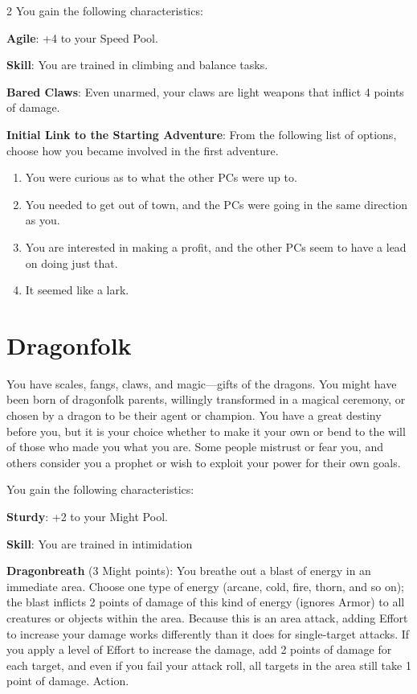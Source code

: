 \begin{multicols}{2}
You gain the following characteristics: 

\textbf{Agile}: +4 to your Speed Pool.

\textbf{Skill}: You are trained in climbing and balance tasks. 

\textbf{Bared Claws}: Even unarmed, your claws are light weapons that inflict 4 points of damage. 

\textbf{Initial Link to the Starting Adventure}: From the following list of options, choose how you became involved in the first adventure. 

\begin{enumerate}
\item You were curious as to what the other PCs were up to. 

\item You needed to get out of town, and the PCs were going in the same direction as you. 

\item You are interested in making a profit, and the other PCs seem to have a lead on doing just that. 

\item It seemed like a lark.
\end{enumerate}

\section{Dragonfolk}

You have scales, fangs, claws, and magic—gifts of the dragons. You might have been born of dragonfolk parents, willingly transformed in a magical ceremony, or chosen by a dragon to be their agent or champion. You have a great destiny before you, but it is your choice whether to make it your own or bend to the will of those who made you what you are. Some people mistrust or fear you, and others consider you a prophet or wish to exploit your power for their own goals. 

You gain the following characteristics: 

\textbf{Sturdy}: +2 to your Might Pool. 

\textbf{Skill}: You are trained in intimidation

\textbf{Dragonbreath} (3 Might points): You breathe out a blast of energy in an immediate area. Choose one type of energy (arcane, cold, fire, thorn, and so on); the blast inflicts 2 points of damage of this kind of energy (ignores Armor) to all creatures or objects within the area. Because this is an area attack, adding Effort to increase your damage works differently than it does for single-target attacks. If you apply a level of Effort to increase the damage, add 2 points of damage for each target, and even if you fail your attack roll, all targets in the area still take 1 point of damage. Action. 


\end{multicols}
